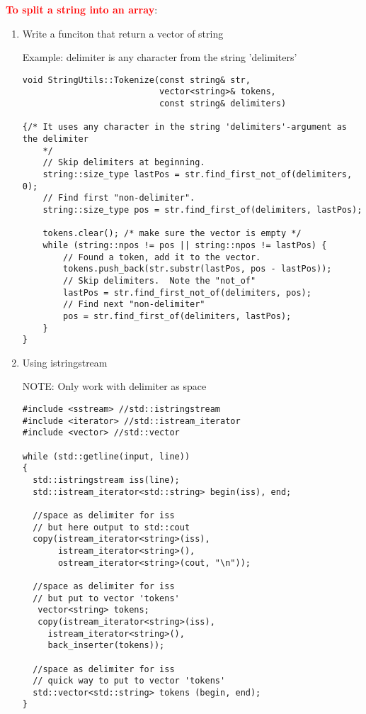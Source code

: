 \textcolor{red}{\bf To split a string into an array}:
\begin{enumerate}
  \item Write a funciton that return a vector of string
  
Example: delimiter is any character from the string 'delimiters'

\begin{lstlisting}
void StringUtils::Tokenize(const string& str,
                           vector<string>& tokens,
                           const string& delimiters)

{/* It uses any character in the string 'delimiters'-argument as the delimiter
	*/
    // Skip delimiters at beginning.
    string::size_type lastPos = str.find_first_not_of(delimiters, 0);
    // Find first "non-delimiter".
    string::size_type pos = str.find_first_of(delimiters, lastPos);

    tokens.clear(); /* make sure the vector is empty */
    while (string::npos != pos || string::npos != lastPos) {
        // Found a token, add it to the vector.
        tokens.push_back(str.substr(lastPos, pos - lastPos));
        // Skip delimiters.  Note the "not_of"
        lastPos = str.find_first_not_of(delimiters, pos);
        // Find next "non-delimiter"
        pos = str.find_first_of(delimiters, lastPos);
    }
}
\end{lstlisting}

  \item Using istringstream

NOTE: Only work with delimiter as space

\begin{verbatim}
#include <sstream> //std::istringstream
#include <iterator> //std::istream_iterator
#include <vector> //std::vector

while (std::getline(input, line))
{
  std::istringstream iss(line);
  std::istream_iterator<std::string> begin(iss), end;
  
  //space as delimiter for iss
  // but here output to std::cout
  copy(istream_iterator<string>(iss),
       istream_iterator<string>(),
       ostream_iterator<string>(cout, "\n"));
       
  //space as delimiter for iss
  // but put to vector 'tokens'
   vector<string> tokens;
   copy(istream_iterator<string>(iss),
     istream_iterator<string>(),
     back_inserter(tokens));

  //space as delimiter for iss
  // quick way to put to vector 'tokens'
  std::vector<std::string> tokens (begin, end);  
}
\end{verbatim}


\end{enumerate}
